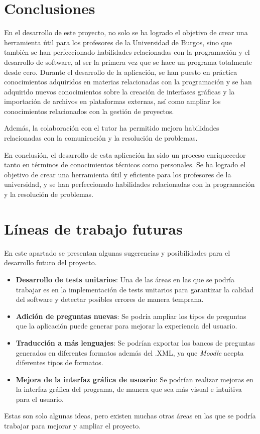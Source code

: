 
\section{Conclusiones}


En el desarrollo de este proyecto, no solo se ha logrado el objetivo de crear una herramienta útil para los profesores de la Universidad de Burgos, sino que también se han perfeccionado habilidades relacionadas con la programación y el desarrollo de software, al ser la primera vez que se hace un programa totalmente desde cero. Durante el desarrollo de la aplicación, se han puesto en práctica conocimientos adquiridos en materias relacionadas con la programación y se han adquirido nuevos conocimientos sobre la creación de interfases gráficas y la importación de archivos en plataformas externas, así como ampliar los conocimientos relacionados con la gestión de proyectos.

Además, la colaboración con el tutor ha permitido mejora habilidades relacionadas con la comunicación y la resolución de problemas.

En conclusión, el desarrollo de esta aplicación ha sido un proceso enriquecedor tanto en términos de conocimientos técnicos como personales. Se ha logrado el objetivo de crear una herramienta útil y eficiente para los profesores de la universidad, y se han perfeccionado habilidades relacionadas con la programación y la resolución de problemas.

\section{Líneas de trabajo futuras}

En este apartado se presentan algunas sugerencias y posibilidades para el desarrollo futuro del proyecto.

\begin{itemize}
    \item \textbf{Desarrollo de tests unitarios}: Una de las áreas en las que se podría trabajar es en la implementación de tests unitarios para garantizar la calidad del software y detectar posibles errores de manera temprana.
    \item \textbf{Adición de preguntas nuevas}: Se podría ampliar los tipos de preguntas que la aplicación puede generar para mejorar la experiencia del usuario.
    \item \textbf{Traducción a más lenguajes}: Se podrían exportar los bancos de preguntas generados en diferentes formatos además del .XML, ya que \textit{Moodle} acepta diferentes tipos de formatos.
    \item \textbf{Mejora de la interfaz gráfica de usuario}: Se podrían realizar mejoras en la interfaz gráfica del programa, de manera que sea más visual e intuitiva para el usuario. 
\end{itemize}

Estas son solo algunas ideas, pero existen muchas otras áreas en las que se podría trabajar para mejorar y ampliar el proyecto.